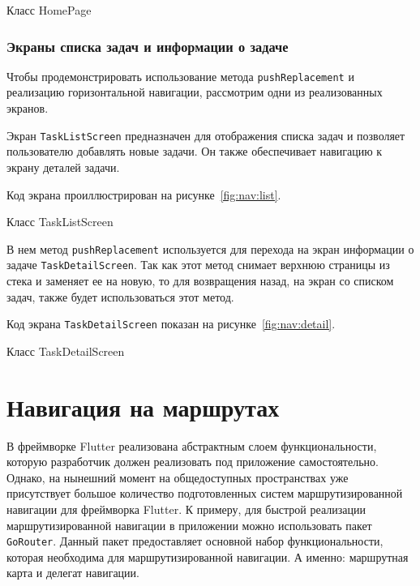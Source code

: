 \begin{image}
	\caption{Класс HomePage}
	\label{fig:nav:stats:show}
\end{image}

\subsubsection{Экраны списка задач и информации о задаче}

Чтобы продемонстрировать использование метода \texttt{pushReplacement}
и реализацию горизонтальной навигации,
рассмотрим одни из реализованных экранов.\par
Экран \texttt{TaskListScreen} предназначен
для отображения списка задач и позволяет пользователю добавлять новые задачи.
Он также обеспечивает навигацию к экрану деталей задачи.

Код экрана проиллюстрирован на рисунке~\ref{fig:nav:list}.

\begin{image}
	\caption{Класс TaskListScreen}
	\label{fig:nav:list}
\end{image}

В нем метод \texttt{pushReplacement} используется для перехода
на экран информации о задаче \texttt{TaskDetailScreen}.
Так как этот метод снимает верхнюю страницы из стека и заменяет ее на новую,
то для возвращения назад, на экран со списком задач,
также будет использоваться этот метод.

Код экрана \texttt{TaskDetailScreen} показан на рисунке~\ref{fig:nav:detail}.

\begin{image}
	\caption{Класс TaskDetailScreen}
	\label{fig:nav:detail}
\end{image}

\section{Навигация на маршрутах}

В фреймворке Flutter реализована абстрактным слоем функциональности,
которую разработчик должен реализовать под приложение самостоятельно.
Однако, на нынешний момент на общедоступных пространствах
уже присутствует большое количество подготовленных систем маршрутизированной
навигации для фреймворка Flutter.
К примеру, для быстрой реализации маршрутизированной навигации
в приложении можно использовать пакет \texttt{GoRouter}.
Данный пакет предоставляет основной набор функциональности,
которая необходима для маршрутизированной навигации.
А именно: маршрутная карта и делегат навигации.

